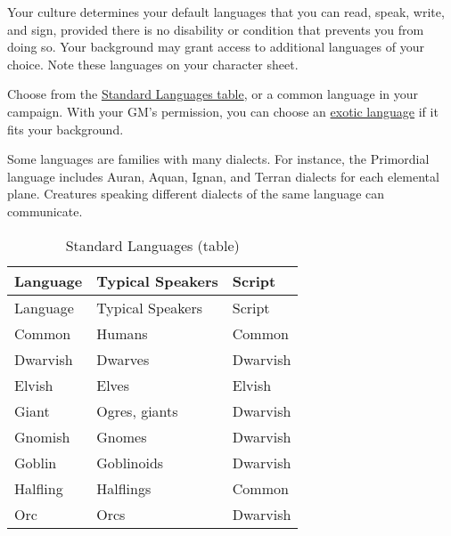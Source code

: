 Your culture determines your default languages that you can read, speak,
write, and sign, provided there is no disability or condition that
prevents you from doing so. Your background may grant access to
additional languages of your choice. Note these languages on your
character sheet.

Choose from the \hyperref[languages-standard-table]{Standard Languages
table}, or a common language in your campaign. With your GM's
permission, you can choose an \hyperref[languages-exotic-table]{exotic
language} if it fits your background.

Some languages are families with many dialects. For instance, the
Primordial language includes Auran, Aquan, Ignan, and Terran dialects
for each elemental plane. Creatures speaking different dialects of the
same language can communicate.

\begin{longtable}[]{@{}
  >{\raggedright\arraybackslash}p{}
  >{\raggedright\arraybackslash}p{}
  >{\raggedright\arraybackslash}p{}@{}}
\caption{Standard Languages
(table)}\label{languages-standard-table}\tabularnewline
\toprule\noalign{}
\begin{minipage}[b]{\linewidth}\raggedright
Language
\end{minipage} & \begin{minipage}[b]{\linewidth}\raggedright
Typical Speakers
\end{minipage} & \begin{minipage}[b]{\linewidth}\raggedright
Script
\end{minipage} \\
\midrule\noalign{}
\endfirsthead
\toprule\noalign{}
\begin{minipage}[b]{\linewidth}\raggedright
Language
\end{minipage} & \begin{minipage}[b]{\linewidth}\raggedright
Typical Speakers
\end{minipage} & \begin{minipage}[b]{\linewidth}\raggedright
Script
\end{minipage} \\
\midrule\noalign{}
\endhead
\bottomrule\noalign{}
\endlastfoot
Common & Humans & Common \\
Dwarvish & Dwarves & Dwarvish \\
Elvish & Elves & Elvish \\
Giant & Ogres, giants & Dwarvish \\
Gnomish & Gnomes & Dwarvish \\
Goblin & Goblinoids & Dwarvish \\
Halfling & Halflings & Common \\
Orc & Orcs & Dwarvish \\
\end{longtable}

